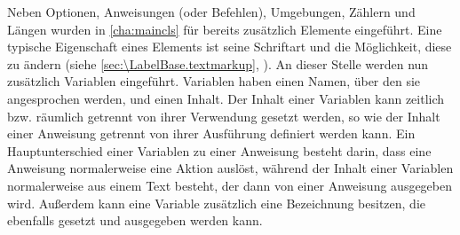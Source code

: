 Neben Optionen, Anweisungen (oder Befehlen), Umgebungen, Zählern und Längen
wurden in \autoref{cha:maincls} für \KOMAScript{} bereits zusätzlich Elemente
eingeführt.  Eine typische Eigenschaft eines Elements ist seine Schriftart und
die Möglichkeit, diese zu ändern (siehe \autoref{sec:\LabelBase.textmarkup},
).  An dieser Stelle werden nun
zusätzlich Variablen eingeführt. Variablen haben einen
Namen, über den sie angesprochen werden,
und einen Inhalt. Der Inhalt einer
Variablen kann zeitlich bzw. räumlich getrennt von ihrer Verwendung gesetzt
werden, so wie der Inhalt einer Anweisung getrennt von ihrer Ausführung
definiert werden kann. Ein Hauptunterschied einer Variablen zu einer Anweisung
besteht darin, dass eine Anweisung normalerweise eine Aktion auslöst, während
der Inhalt einer Variablen normalerweise aus einem Text besteht, der dann von
einer Anweisung ausgegeben wird. Außerdem kann eine Variable zusätzlich eine
Bezeichnung besitzen, die
ebenfalls gesetzt und ausgegeben werden kann.

